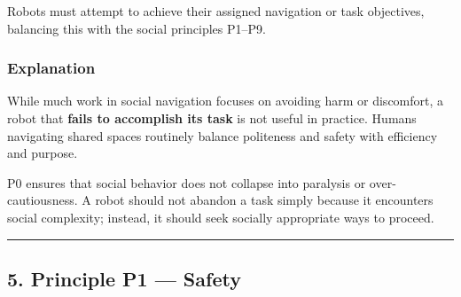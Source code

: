 \documentclass[utf8]{frontiers_suppmat} %
\newenvironment{Shaded}{\begin{shaded}}{\end{shaded}}
\begin{document}
Robots must attempt to achieve their assigned navigation or task
objectives, balancing this with the social principles P1--P9.

\subsubsection{Explanation}\label{explanation}

While much work in social navigation focuses on avoiding harm or
discomfort, a robot that \textbf{fails to accomplish its task} is not
useful in practice. Humans navigating shared spaces routinely balance
politeness and safety with efficiency and purpose.

P0 ensures that social behavior does not collapse into paralysis or
over-cautiousness. A robot should not abandon a task simply because it
encounters social complexity; instead, it should seek socially
appropriate ways to proceed.

\begin{Shaded}
\begin{Highlighting}[]
\KeywordTok{:}
\KeywordTok{:}
\KeywordTok{:}
\KeywordTok{: }\CharTok{\textgreater{}}
\KeywordTok{:}
\AttributeTok{  }\KeywordTok{:}
\AttributeTok{    }\KeywordTok{{-}}\AttributeTok{ }
\AttributeTok{    }\KeywordTok{{-}}\AttributeTok{ }
\AttributeTok{  }\KeywordTok{:}
\AttributeTok{    }\KeywordTok{{-}}\AttributeTok{ }
\AttributeTok{    }\KeywordTok{{-}}\AttributeTok{ }
\end{Highlighting}
\end{Shaded}

\begin{center}\rule{0.5\linewidth}{0.5pt}\end{center}

\subsection{5. Principle P1 --- Safety}\label{principle-p1-safety}
\end{document}
